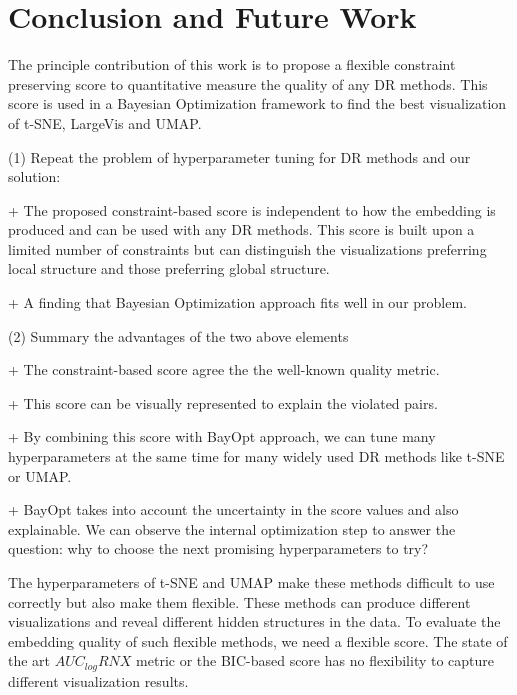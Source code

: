 \section{Conclusion and Future Work}
The principle contribution of this work is to propose a flexible constraint preserving score to quantitative measure the quality of any DR methods.
This score is used in a Bayesian Optimization framework to find the best visualization of t-SNE, LargeVis and UMAP.


\par (1) Repeat the problem of hyperparameter tuning for DR methods and our solution:

+ The proposed constraint-based score is independent to how the embedding is produced and can be used with any DR methods.
This score is built upon a limited number of constraints but can distinguish the visualizations preferring local structure and those preferring global structure.

+ A finding that Bayesian Optimization approach fits well in our problem.


\vspace{8pt}
\par (2) Summary the advantages of the two above elements

+ The constraint-based score agree the the well-known quality metric.

+ This score can be visually represented to explain the violated pairs.

+ By combining this score with BayOpt approach, we can tune many hyperparameters at the same time for many widely used DR methods like t-SNE or UMAP.

+ BayOpt takes into account the uncertainty in the score values and also explainable. We can observe the internal optimization step to answer the question: why to choose the next promising hyperparameters to try?

The hyperparameters of t-SNE and UMAP make these methods difficult to use correctly but also make them flexible.
These methods can produce different visualizations and reveal different hidden structures in the data.
To evaluate the embedding quality of such flexible methods, we need a flexible score.
The state of the art $AUC_{log}RNX$ metric or the BIC-based score has no flexibility to capture different visualization results.

